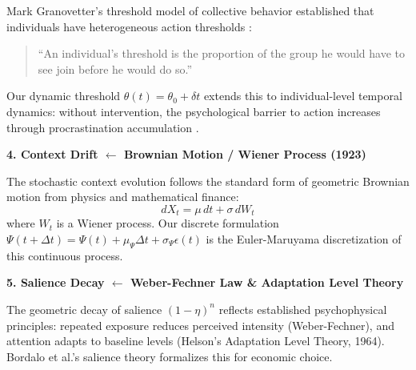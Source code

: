 \documentclass[11pt, a4paper]{article}
\begin{document}
\begin{tcolorbox}[colback=blue!5!white, colframe=blue!75!black,
    title=\textbf{Scientific Foundations: NTM in Historical Context}]
Mark Granovetter's threshold model of collective behavior established that individuals have heterogeneous action thresholds \citep{granovetter1978threshold}:
\begin{quote}
``An individual's threshold is the proportion of the group he would have to see join before he would do so.''
\end{quote}

Our dynamic threshold $\theta(t) = \theta_0 + \delta t$ extends this to individual-level temporal dynamics: without intervention, the psychological barrier to action increases through procrastination accumulation \citep{akerlof1991procrastination, odonoghue2001choice}.

\vspace{0.5em}
\textbf{4. Context Drift $\leftarrow$ Brownian Motion / Wiener Process (1923)}

The stochastic context evolution follows the standard form of geometric Brownian motion from physics and mathematical finance:
\begin{equation}
dX_t = \mu \, dt + \sigma \, dW_t
\end{equation}
where $W_t$ is a Wiener process. Our discrete formulation $\Psi(t+\Delta t) = \Psi(t) + \mu_\Psi \Delta t + \sigma_\Psi \epsilon(t)$ is the Euler-Maruyama discretization of this continuous process.

\vspace{0.5em}
\textbf{5. Salience Decay $\leftarrow$ Weber-Fechner Law \& Adaptation Level Theory}

The geometric decay of salience $(1-\eta)^n$ reflects established psychophysical principles: repeated exposure reduces perceived intensity (Weber-Fechner), and attention adapts to baseline levels (Helson's Adaptation Level Theory, 1964). Bordalo et al.'s salience theory \citep{bordalo2012salience} formalizes this for economic choice.

\end{tcolorbox}
\end{document}
